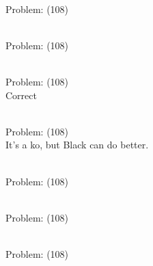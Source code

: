 \documentclass[11pt]{article}
\begin{document}
\begin{minipage}[t]{0.5\textwidth}
  {\centering
  
\\
Problem: (108)\\
  }
\end{minipage}
\begin{minipage}[t]{0.5\textwidth}
  {\centering
  
\\
Problem: (108)\\
  }
\end{minipage}
\begin{minipage}[t]{0.5\textwidth}
  {\centering
  
\\
Problem: (108)\\
Correct\\
  }
\end{minipage}
\begin{minipage}[t]{0.5\textwidth}
  {\centering
  
\\
Problem: (108)\\
It's a ko, but Black can do better.\\
  }
\end{minipage}
\begin{minipage}[t]{0.5\textwidth}
  {\centering
  
\\
Problem: (108)\\
  }
\end{minipage}
\begin{minipage}[t]{0.5\textwidth}
  {\centering
  
\\
Problem: (108)\\
  }
\end{minipage}
\begin{minipage}[t]{0.5\textwidth}
  {\centering
  
\\
Problem: (108)\\
  }
\end{minipage}
\end{document}
